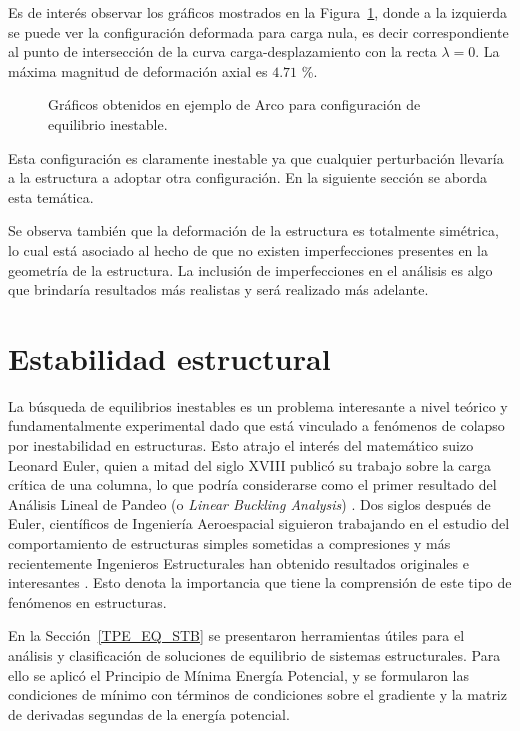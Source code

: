 Es de interés observar los gráficos mostrados en la Figura~\ref{fig:arcocarga6}, donde a la izquierda se puede ver la configuración deformada para carga nula, es decir correspondiente al punto de intersección de la curva carga-desplazamiento con la recta $\lambda=0$. La máxima magnitud de deformación axial es $4.71$ \%.
%

\begin{figure}[htb]
	\centering
	\resizebox{.47\linewidth}{!}{}
	\resizebox{.47\linewidth}{!}{}
	\caption{Gráficos obtenidos en ejemplo de Arco para configuración de equilibrio inestable.}
	\label{fig:arcocarga6}
\end{figure}

Esta configuración es claramente inestable ya que cualquier perturbación llevaría a la estructura a adoptar otra configuración. En la siguiente sección se aborda esta temática. %
%

Se observa también que la deformación de la estructura es totalmente simétrica, lo cual está asociado al hecho de que no existen imperfecciones presentes en la geometría de la estructura. La inclusión de imperfecciones en el análisis es algo que brindaría resultados más realistas y será realizado más adelante.


\section{Estabilidad estructural}

La búsqueda de equilibrios inestables es un problema interesante a nivel teórico y fundamentalmente experimental dado que está vinculado a fenómenos de colapso por inestabilidad en estructuras. %
%
Esto atrajo el interés del matemático suizo Leonard Euler, quien a mitad del siglo XVIII publicó su trabajo sobre la carga crítica de una columna, lo que podría considerarse como el primer resultado del Análisis Lineal de Pandeo (o \textit{Linear Buckling Analysis}) \citep{Timoshenko1953}. %
%
Dos siglos después de Euler, científicos de Ingeniería Aeroespacial siguieron trabajando en el estudio del comportamiento de estructuras simples sometidas a compresiones \cite{Huang1971} y más recientemente Ingenieros Estructurales han obtenido resultados originales e interesantes \citep{Bigoni2014,Zaccaria2011}. %
%
Esto denota la importancia que tiene la comprensión de este tipo de fenómenos en estructuras.


En la Sección~\ref{TPE_EQ_STB} se presentaron herramientas útiles para el análisis y clasificación de soluciones de equilibrio de sistemas estructurales. %
%
Para ello se aplicó el Principio de Mínima Energía Potencial, y se formularon las condiciones de mínimo con términos de condiciones sobre el gradiente y la matriz de derivadas segundas de la energía potencial. %

